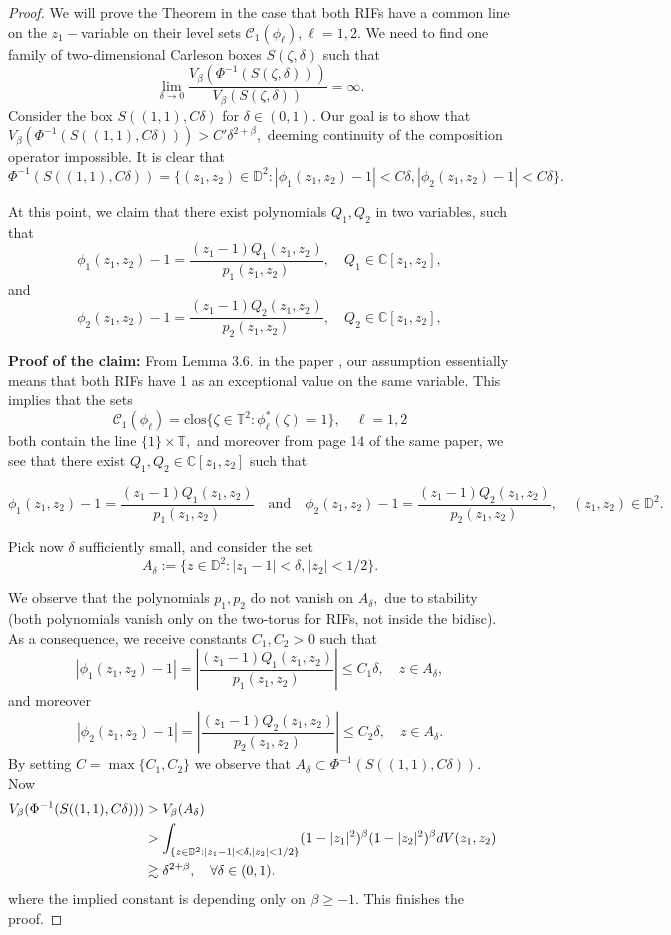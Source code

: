 \documentclass[12pt]{amsart}
\numberwithin{equation}{section}
\begin{document}
\begin{proof}
We will prove the Theorem in the case that both RIFs have a common line on the $z_1-$variable on their level sets $\mathcal{C}_{1}(\phi_\ell), \ell=1,2.$
We need to find one family of two-dimensional Carleson boxes $S(\zeta,\delta)$ such that 
$$\lim_{\delta\to0}\frac{V_{\beta}(\Phi^{-1}(S(\zeta,\delta)))}{V_{\beta}(S(\zeta,\delta))}=\infty.$$ 
Consider the box $S((1,1),C\delta)$ for $\delta\in(0,1).$ Our goal is to show that $V_{\beta}(\Phi^{-1}(S((1,1),C\delta)))>C'\delta^{2+\beta},$ deeming continuity of the composition operator impossible. 
It is clear that
$$\Phi^{-1}(S((1,1),C\delta))=\Bigg\{(z_1,z_2)\in\mathbb{D}^2:\left|\phi_1(z_1,z_2)-1\right|<C\delta,|\phi_2(z_1,z_2)-1|<C\delta\Bigg\}.$$

At this point, we claim that there exist polynomials $Q_1,Q_2$ in two variables, such that $$\phi_1(z_1,z_2)-1=\frac{(z_1-1)Q_1(z_1,z_2)}{p_1(z_1,z_2)}, \quad Q_1\in\mathbb{C}[z_1,z_2],$$
and
$$\phi_2(z_1,z_2)-1=\frac{(z_1-1)Q_2(z_1,z_2)}{p_2(z_1,z_2)}, \quad Q_2\in\mathbb{C}[z_1,z_2],$$

\textbf{Proof of the claim:}
From Lemma 3.6. in the paper \cite{Clark}, our assumption essentially means that both RIFs have 1 as an exceptional value on the same variable. This implies that the sets $$\mathcal{C}_1(\phi_\ell)=\mathrm{clos}\{\zeta\in\mathbb{T}^2:\phi^*_{\ell}(\zeta)=1\},\quad \ell=1,2$$ both contain the line $\{1\}\times \mathbb{T},$ and moreover from page 14 of the same paper, we see that there exist $Q_1,Q_2\in \mathbb{C}[z_1,z_2]$ such that

$$\phi_1(z_1,z_2)-1=\frac{(z_1-1)Q_1(z_1,z_2)}{p_1(z_1,z_2)} \quad \mathrm{and} \quad \phi_2(z_1,z_2)-1=\frac{(z_1-1)Q_2(z_1,z_2)}{p_2(z_1,z_2)}, \quad (z_1,z_2)\in\mathbb{D}^2. $$

Pick now $\delta$ sufficiently small, and consider the set
$$A_{\delta}:=\{z\in\mathbb{D}^2:|z_1-1|<\delta,|z_2|<1/2\}.$$

We observe that the polynomials $p_1,p_2$ do not vanish on $A_\delta,$ due to stability (both polynomials vanish only on the two-torus for RIFs, not inside the bidisc). As a consequence, we receive constants $C_1,C_2>0$ such that
$$|\phi_1(z_1,z_2)-1|=\left|\frac{(z_1-1)Q_1(z_1,z_2)}{p_1(z_1,z_2)}\right|\leq C_1\delta, \quad z\in A_{\delta},$$
and moreover
$$|\phi_2(z_1,z_2)-1|=\left|\frac{(z_1-1)Q_2(z_1,z_2)}{p_2(z_1,z_2)}\right|\leq C_2\delta, \quad z\in A_{\delta}.$$
By setting $C=\max\{C_1,C_2\}$ we observe that
$A_{\delta}\subset\Phi^{-1}(S((1,1),C\delta)).$
Now 
\begin{align}
V_{\beta}(\Phi^{-1}(S((1,1),C\delta)))
&>V_{\beta}(A_{\delta})&&\\
&>\int_{\{z\in\mathbb{D}^2:|z_1-1|<\delta, |z_2|<1/2\}}(1-|z_1|^2)^{\beta}(1-|z_2|^2)^{\beta}dV(z_1,z_2) \notag&&\\
&\gtrsim\delta^{2+\beta}, \quad \forall \delta\in (0,1). \notag
\end{align}
where the implied constant is depending only on $\beta\ge -1.$
This finishes the proof.
\end{proof}
\end{document}

